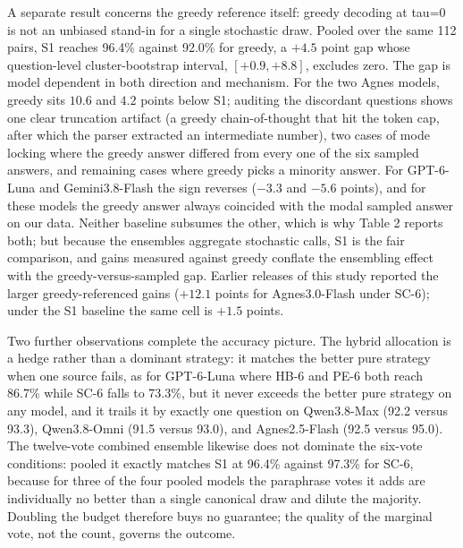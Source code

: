 \documentclass[preprint,12pt]{elsarticle}
\begin{document}
A separate result concerns the greedy reference itself: greedy decoding at tau=0 is not an unbiased stand-in for a single stochastic draw. Pooled over the same 112 pairs, S1 reaches 96.4\% against 92.0\% for greedy, a $+4.5$ point gap whose question-level cluster-bootstrap interval, $[+0.9, +8.8]$, excludes zero. The gap is model dependent in both direction and mechanism. For the two Agnes models, greedy sits $10.6$ and $4.2$ points below S1; auditing the discordant questions shows one clear truncation artifact (a greedy chain-of-thought that hit the token cap, after which the parser extracted an intermediate number), two cases of mode locking where the greedy answer differed from every one of the six sampled answers, and remaining cases where greedy picks a minority answer. For GPT-6-Luna and Gemini3.8-Flash the sign reverses ($-3.3$ and $-5.6$ points), and for these models the greedy answer always coincided with the modal sampled answer on our data. Neither baseline subsumes the other, which is why Table 2 reports both; but because the ensembles aggregate stochastic calls, S1 is the fair comparison, and gains measured against greedy conflate the ensembling effect with the greedy-versus-sampled gap. Earlier releases of this study reported the larger greedy-referenced gains ($+12.1$ points for Agnes3.0-Flash under SC-6); under the S1 baseline the same cell is $+1.5$ points.

Two further observations complete the accuracy picture. The hybrid allocation is a hedge rather than a dominant strategy: it matches the better pure strategy when one source fails, as for GPT-6-Luna where HB-6 and PE-6 both reach 86.7\% while SC-6 falls to 73.3\%, but it never exceeds the better pure strategy on any model, and it trails it by exactly one question on Qwen3.8-Max (92.2 versus 93.3), Qwen3.8-Omni (91.5 versus 93.0), and Agnes2.5-Flash (92.5 versus 95.0). The twelve-vote combined ensemble likewise does not dominate the six-vote conditions: pooled it exactly matches S1 at 96.4\% against 97.3\% for SC-6, because for three of the four pooled models the paraphrase votes it adds are individually no better than a single canonical draw and dilute the majority. Doubling the budget therefore buys no guarantee; the quality of the marginal vote, not the count, governs the outcome.
\end{document}
